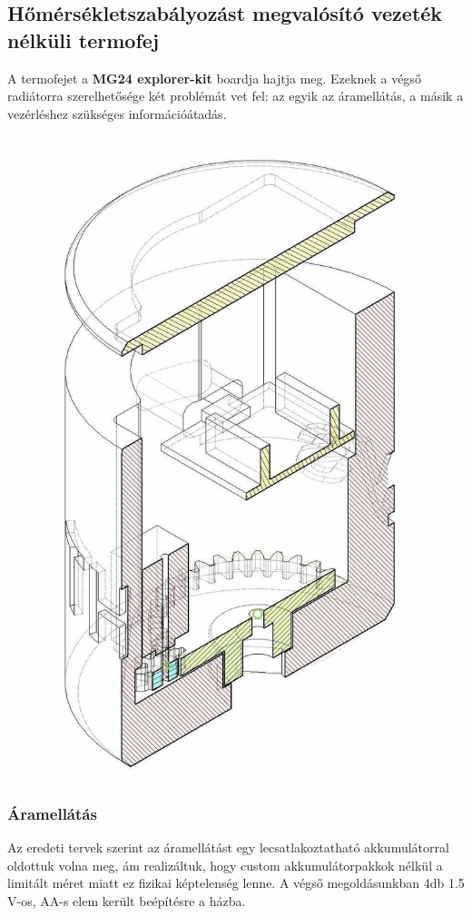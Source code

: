\documentclass[12pt,a4paper]{article}
\begin{document}
\subsection{Hőmérsékletszabályozást megvalósító vezeték nélküli termofej}
\begin{minipage}{0.65\textwidth}
A termofejet a \textbf{MG24 explorer-kit} boardja hajtja meg. Ezeknek a végső radiátorra szerelhetősége két problémát vet fel: az egyik az áramellátás,
a másik a vezérléshez szükséges információátadás.
\end{minipage}
\hfill
\begin{minipage}{0.3\textwidth}
    \centering
    \includegraphics[width=\textwidth]{figures/termofej.jpg}
\end{minipage}

\subsubsection{Áramellátás}
Az eredeti tervek szerint az áramellátást egy lecsatlakoztatható akkumulátorral oldottuk volna meg, ám realizáltuk, hogy custom akkumulátorpakkok nélkül a limitált méret
miatt ez fizikai képtelenség lenne. A végső megoldásunkban 4db 1.5 V-os, AA-s elem került beépítésre a házba.
\end{document}
